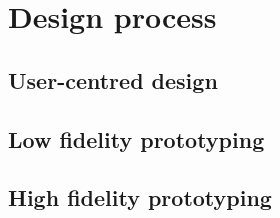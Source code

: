 \section{Design process}


\subsection{User-centred design}


\cite{lu2011pubmed, hearst2007biotext}



\cite{bolchini2009better, pavelin2012bioinformatics}


\subsection{Low fidelity prototyping}

\cite{egger2000lofi}



\subsection{High fidelity prototyping}


